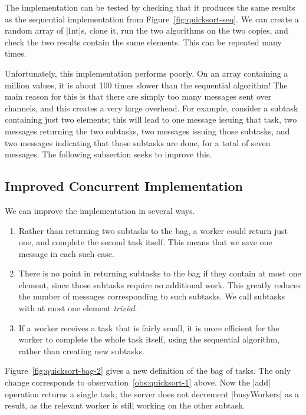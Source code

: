 
The implementation can be tested by checking that it produces
the same results as the sequential implementation from
Figure~\ref{fig:quicksort-seq}.  We can create a random array of |Int|s, clone
it, run the two algorithms on the two copies, and check the two results
contain the same elements.  This can be repeated many times.

Unfortunately, this implementation performs poorly.  On an array containing a
million values, it is about 100 times slower than the sequential algorithm!
The main reason for this is that there are simply too many messages sent over
channels, and this creates a very large overhead.  For example, consider a
subtask containing just two elements; this will lead to one message issuing
that task, two messages returning the two subtasks, two messages issuing those
subtasks, and two messages indicating that those subtasks are done, for a
total of seven messages.  The following subsection seeks to improve this.



\subsection{Improved Concurrent Implementation} 

We can improve the implementation in several ways.
%
\begin{enumerate}
\item \label{obs:quicksort-1}
  Rather than returning two subtasks to the bag, a worker could return
  just one, and complete the second task itself.  This means that we save one
  message in each such case.

\item There is no point in returning subtasks to the bag if they contain at
  most one element, since those subtasks require no additional work.  This
  greatly reduces the number of messages corresponding to such subtasks.  We
  call subtasks with at most one element \emph{trivial}. 

\item\label{obs:quicksort-3} If a worker receives a task that is fairly small,
  it is more efficient for the worker to complete the whole task itself, using
  the sequential algorithm, rather than creating new subtasks.
\end{enumerate}

Figure~\ref{fig:quicksort-bag-2} gives a new definition of the bag of tasks.
The only change corresponds to observation~\ref{obs:quicksort-1} above.  Now
the |add| operation returns a single task; the server does not decrement
|busyWorkers| as a result, as the relevant worker is still working on the
other subtask. 

